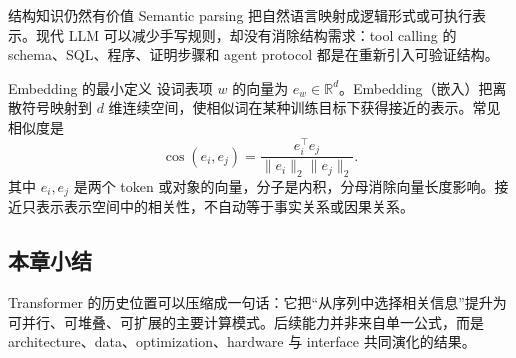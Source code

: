 
\begin{importantbox}{结构知识仍然有价值}
Semantic parsing 把自然语言映射成逻辑形式或可执行表示。现代 LLM 可以减少手写规则，却没有消除结构需求：tool calling 的 schema、SQL、程序、证明步骤和 agent protocol 都是在重新引入可验证结构。
\end{importantbox}


\begin{importantbox}{Embedding 的最小定义}
设词表项 $w$ 的向量为 $e_w\in\mathbb{R}^{d}$。Embedding（嵌入）把离散符号映射到 $d$ 维连续空间，使相似词在某种训练目标下获得接近的表示。常见相似度是
\[
\operatorname{cos}(e_i,e_j)=\frac{e_i^\top e_j}{\lVert e_i\rVert_2\lVert e_j\rVert_2}.
\]
其中 $e_i,e_j$ 是两个 token 或对象的向量，分子是内积，分母消除向量长度影响。接近只表示表示空间中的相关性，不自动等于事实关系或因果关系。
\end{importantbox}

\subsection{本章小结}

Transformer 的历史位置可以压缩成一句话：它把“从序列中选择相关信息”提升为可并行、可堆叠、可扩展的主要计算模式。后续能力并非来自单一公式，而是 architecture、data、optimization、hardware 与 interface 共同演化的结果。

